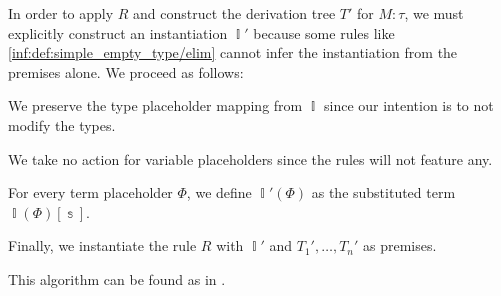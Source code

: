 \begin{algorithm}
\begin{thmenum}
    In order to apply \( R \) and construct the derivation tree \( T' \) for \( M: \tau \), we must explicitly construct an instantiation \( \BbbI' \) because some rules like \ref{inf:def:simple_empty_type/elim} cannot infer the instantiation from the premises alone. We proceed as follows:
    \begin{thmenum}
       We preserve the type placeholder mapping from \( \BbbI \) since our intention is to not modify the types.

       We take no action for variable placeholders since the rules will not feature any.

       For every term placeholder \( \Phi \), we define \( \BbbI'(\Phi) \) as the substituted term \( \BbbI(\Phi)[\Bbbs] \).
    \end{thmenum}

    Finally, we instantiate the rule \( R \) with \( \BbbI' \) and \( T_1', \ldots, T_n' \) as premises.
  \end{thmenum}
\end{algorithm}
\begin{comments}
  \item This algorithm can be found as  in \cite{notebook:code}.
\end{comments}

